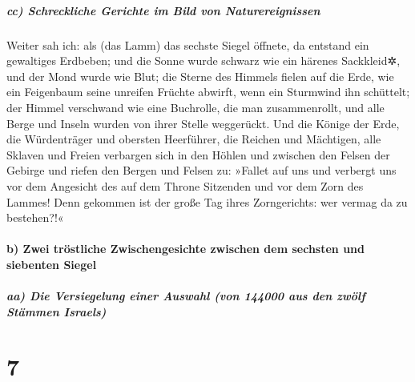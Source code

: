 \hypertarget{cc-schreckliche-gerichte-im-bild-von-naturereignissen}{%
\subparagraph{cc) Schreckliche Gerichte im Bild von
Naturereignissen}\label{cc-schreckliche-gerichte-im-bild-von-naturereignissen}}

 Weiter sah ich: als (das Lamm) das sechste Siegel
öffnete, da entstand ein gewaltiges Erdbeben; und die Sonne wurde
schwarz wie ein härenes Sackkleid✲, und der Mond wurde wie Blut;
 die Sterne des Himmels fielen auf die Erde, wie ein
Feigenbaum seine unreifen Früchte abwirft, wenn ein Sturmwind ihn
schüttelt;  der Himmel verschwand wie eine Buchrolle, die
man zusammenrollt, und alle Berge und Inseln wurden von ihrer Stelle
weggerückt.  Und die Könige der Erde, die Würdenträger
und obersten Heerführer, die Reichen und Mächtigen, alle Sklaven und
Freien verbargen sich in den Höhlen und zwischen den Felsen der Gebirge
 und riefen den Bergen und Felsen zu: »Fallet auf uns und
verbergt uns vor dem Angesicht des auf dem Throne Sitzenden und vor dem
Zorn des Lammes!  Denn gekommen ist der große Tag ihres
Zorngerichts: wer vermag da zu bestehen?!«

\hypertarget{b-zwei-truxf6stliche-zwischengesichte-zwischen-dem-sechsten-und-siebenten-siegel}{%
\paragraph{b) Zwei tröstliche Zwischengesichte zwischen dem sechsten und
siebenten
Siegel}\label{b-zwei-truxf6stliche-zwischengesichte-zwischen-dem-sechsten-und-siebenten-siegel}}

\hypertarget{aa-die-versiegelung-einer-auswahl-von-144000-aus-den-zwuxf6lf-stuxe4mmen-israels}{%
\subparagraph{aa) Die Versiegelung einer Auswahl (von 144000 aus den
zwölf Stämmen
Israels)}\label{aa-die-versiegelung-einer-auswahl-von-144000-aus-den-zwuxf6lf-stuxe4mmen-israels}}

\hypertarget{section-6}{%
\section{7}\label{section-6}}

